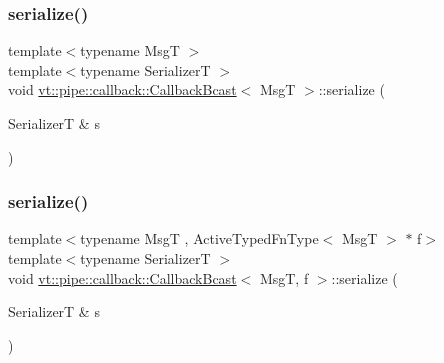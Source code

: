 \subsubsection{\texorpdfstring{serialize()}{serialize()}\hspace{0.1cm}{\footnotesize\ttfamily [1/2]}}
{\footnotesize\ttfamily template$<$typename MsgT $>$ \\
template$<$typename SerializerT $>$ \\
void \hyperlink{structvt_1_1pipe_1_1callback_1_1_callback_bcast}{vt\+::pipe\+::callback\+::\+Callback\+Bcast}$<$ MsgT $>$\+::serialize (\begin{DoxyParamCaption}\item[{SerializerT \&}]{s }\end{DoxyParamCaption})\hspace{0.3cm}{\ttfamily [inline]}}

\mbox{\label{structvt_1_1pipe_1_1callback_1_1_callback_bcast_a1eadd931f74a579b9ec5830006aaf32c}} 
\subsubsection{\texorpdfstring{serialize()}{serialize()}\hspace{0.1cm}{\footnotesize\ttfamily [2/2]}}
{\footnotesize\ttfamily template$<$typename MsgT , Active\+Typed\+Fn\+Type$<$ Msg\+T $>$ $\ast$ f$>$ \\
template$<$typename SerializerT $>$ \\
void \hyperlink{structvt_1_1pipe_1_1callback_1_1_callback_bcast}{vt\+::pipe\+::callback\+::\+Callback\+Bcast}$<$ MsgT, f $>$\+::serialize (\begin{DoxyParamCaption}\item[{SerializerT \&}]{s }\end{DoxyParamCaption})}

\mbox{\label{structvt_1_1pipe_1_1callback_1_1_callback_bcast_aa5c6f297ec676eb2dda4d4b6238fa282}} 
